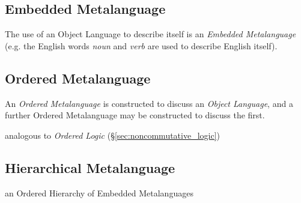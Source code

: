 \subsection{Embedded Metalanguage}\label{sec:embedded_metalanguage}

The use of an Object Language to describe itself is an \emph{Embedded
  Metalanguage} (e.g. the English words \emph{noun} and \emph{verb}
are used to describe English itself).



\subsection{Ordered Metalanguage}\label{sec:ordered_metalanguage}

An \emph{Ordered Metalanguage} is constructed to discuss an
\emph{Object Language}, and a further Ordered Metalanguage may be
constructed to discuss the first.

analogous to \emph{Ordered Logic}
(\S\ref{sec:noncommutative_logic})



\subsection{Hierarchical Metalanguage}\label{sec:hierarchical_metalanguage}

an Ordered Hierarchy of Embedded Metalanguages
